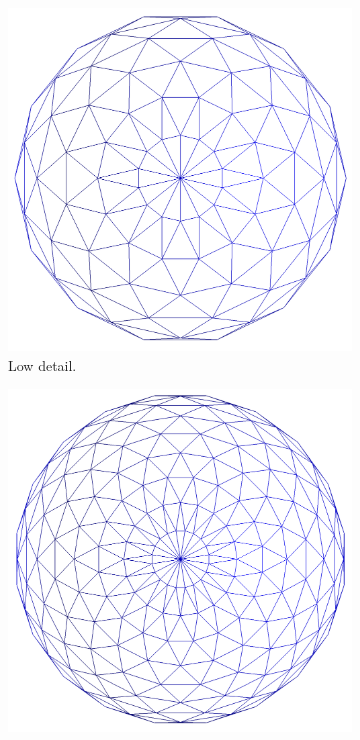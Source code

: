 \begin{figure}
\begin{center}
    \begin{subfigure}{0.3\textwidth}
      \includegraphics[width=\textwidth]{assets/images/lod/1_w}
      \caption{Low detail.}
      \label{fig:lod_1_w}
    \end{subfigure}
    \begin{subfigure}{0.3\textwidth}
      \includegraphics[width=\textwidth]{assets/images/lod/2_w}

\end{subfigure}
\end{center}
\end{figure}
